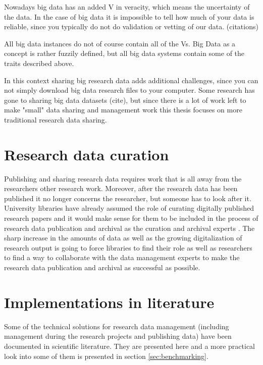 Nowadays big data has an added V in veracity, which means the uncertainty of
the data. In the case of big data it is impossible to tell how much of your data
is reliable, since you typically do not do validation or vetting of our data.
(citations)

All big data instances do not of course contain all of the Vs. Big Data as a
concept is rather fuzzily defined, but all big data systems contain some of the
traits described above.

In this context sharing big research data adds additional challenges, since 
you can not simply download big data research files to your computer. Some
research has gone to sharing big data datasets (cite), but since there is a lot
of work left to make "small" data sharing and management work this thesis
focuses on more traditional research data sharing.

\fi

\section{Research data curation}

Publishing and sharing research data requires work that is all away from the
researchers other research work. Moreover, after the research data has been published
it no longer concerns the researcher, but someone has to look after it.
University libraries have already assumed the role of curating digitally
published research papers and it would make sense for them to be included in
the process of research data publication and archival as the curation and
archival experts  \cite{hjorland2014curating, heidorn2011emerging}. The
sharp increase in the amounts of data as well as the growing digitalization of
research output is going to force libraries to find their role as well as
researchers to find a way to collaborate with the data management experts to
make the research data publication and archival as successful as possible.

\section{Implementations in literature}
\label{sec:implementations_literature}

Some of the technical solutions for research data management (including
management during the research projects and publishing data) have been
documented in scientific literature. They are presented here and a more
practical look into some of them is presented in section
\ref{sec:benchmarking}.

